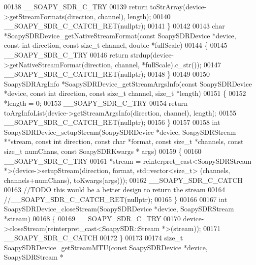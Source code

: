 \begin{DoxyCode}
00138     __SOAPY_SDR_C_TRY
00139     \textcolor{keywordflow}{return} toStrArray(device->getStreamFormats(direction, channel), length);
00140     __SOAPY_SDR_C_CATCH_RET(\textcolor{keyword}{nullptr});
00141 \}
00142 
00143 \textcolor{keywordtype}{char} *SoapySDRDevice_getNativeStreamFormat(\textcolor{keyword}{const} SoapySDRDevice *device, \textcolor{keyword}{const} \textcolor{keywordtype}{int} direction, \textcolor{keyword}{const} \textcolor{keywordtype}{size\_t} 
      channel, \textcolor{keywordtype}{double} *fullScale)
00144 \{
00145     __SOAPY_SDR_C_TRY
00146     \textcolor{keywordflow}{return} strdup(device->getNativeStreamFormat(direction, channel, *fullScale).c\_str());
00147     __SOAPY_SDR_C_CATCH_RET(\textcolor{keyword}{nullptr});
00148 \}
00149 
00150 SoapySDRArgInfo *SoapySDRDevice_getStreamArgsInfo(\textcolor{keyword}{const} SoapySDRDevice *device, \textcolor{keyword}{const} \textcolor{keywordtype}{int} direction, \textcolor{keyword}{const} \textcolor{keywordtype}{
      size\_t} channel, \textcolor{keywordtype}{size\_t} *length)
00151 \{
00152     *length = 0;
00153     __SOAPY_SDR_C_TRY
00154     \textcolor{keywordflow}{return} toArgInfoList(device->getStreamArgsInfo(direction, channel), length);
00155     __SOAPY_SDR_C_CATCH_RET(\textcolor{keyword}{nullptr});
00156 \}
00157 
00158 \textcolor{keywordtype}{int} SoapySDRDevice_setupStream(SoapySDRDevice *device, SoapySDRStream **stream, \textcolor{keyword}{const} \textcolor{keywordtype}{int} direction, \textcolor{keyword}{const} \textcolor{keywordtype}{
      char} *format, \textcolor{keyword}{const} \textcolor{keywordtype}{size\_t} *channels, \textcolor{keyword}{const} \textcolor{keywordtype}{size\_t} numChans, \textcolor{keyword}{const} SoapySDRKwargs *
      args)
00159 \{
00160     __SOAPY_SDR_C_TRY
00161     *stream = \textcolor{keyword}{reinterpret\_cast<}SoapySDRStream *\textcolor{keyword}{>}(device->setupStream(direction, format, std::vector<size\_t>
      (channels, channels+numChans), toKwargs(args)));
00162     __SOAPY_SDR_C_CATCH
00163     \textcolor{comment}{//TODO this would be a better design to return the stream}
00164     \textcolor{comment}{//\_\_SOAPY\_SDR\_C\_CATCH\_RET(nullptr);}
00165 \}
00166 
00167 \textcolor{keywordtype}{int} SoapySDRDevice_closeStream(SoapySDRDevice *device, SoapySDRStream *stream)
00168 \{
00169     __SOAPY_SDR_C_TRY
00170     device->closeStream(reinterpret\_cast<SoapySDR::Stream *>(stream));
00171     __SOAPY_SDR_C_CATCH
00172 \}
00173 
00174 \textcolor{keywordtype}{size\_t} SoapySDRDevice_getStreamMTU(\textcolor{keyword}{const} SoapySDRDevice *device, SoapySDRStream *

\end{DoxyCode}
